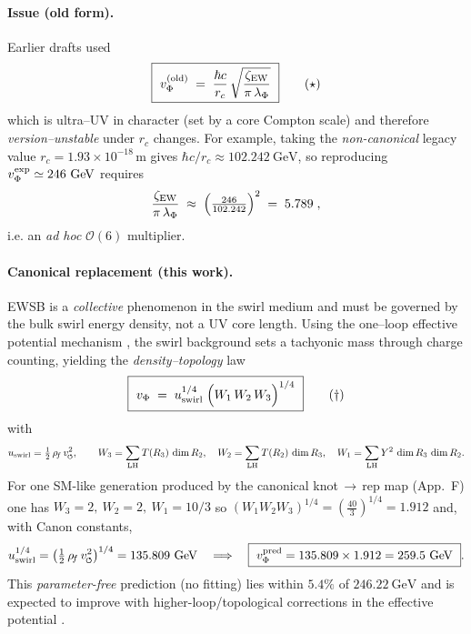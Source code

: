 \documentclass[11pt]{article}
\newcommand{\swirlarrow}{%
     \mathchoice{\mkern-2mu\scriptstyle\boldsymbol{\circlearrowleft}}%
                {\mkern-2mu\scriptstyle\boldsymbol{\circlearrowleft}}%
                {\mkern-2mu\scriptscriptstyle\boldsymbol{\circlearrowleft}}%
                {\mkern-2mu\scriptscriptstyle\boldsymbol{\circlearrowleft}}%
}
\newcommand{\vscore}{v_{\swirlarrow}}                    %
\newcommand{\rhof}{\rho_{\!f}}                           %
\begin{document}
\paragraph{Issue (old form).}
    Earlier drafts used
    \[
        \boxed{\ v_\Phi^{(\text{old})}\;=\;\frac{\hbar c}{r_c}\,
        \sqrt{\frac{\zeta_{\rm EW}}{\pi\,\lambda_\Phi}}\ }\qquad(\star)
    \]
    which is ultra–UV in character (set by a core Compton scale) and therefore \emph{version–unstable} under $r_c$ changes.
    For example, taking the \emph{non-canonical} legacy value $r_c=1.93\times 10^{-18}\,\mathrm{m}$ gives
    \(
    \hbar c/r_c \approx 102.242~\mathrm{GeV}
    \),
    so reproducing $v_\Phi^{\rm exp}\simeq 246~\mathrm{GeV}$ requires
    \[
        \frac{\zeta_{\rm EW}}{\pi\,\lambda_\Phi}\;\approx\;\Big(\tfrac{246}{102.242}\Big)^2\;=\;5.789\;,
    \]
    i.e. an \emph{ad hoc} $\mathcal O(6)$ multiplier.

\paragraph{Canonical replacement (this work).}
    EWSB is a \emph{collective} phenomenon in the swirl medium and must be governed by the bulk swirl energy density,
    not a UV core length. Using the one–loop effective potential mechanism \cite{ColemanWeinberg1973}, the swirl background
    sets a tachyonic mass through charge counting, yielding the \emph{density–topology} law
    \[
        \boxed{\ v_\Phi\;=\;u_{\rm swirl}^{1/4}\;\Big(W_1\,W_2\,W_3\Big)^{1/4}\ }\qquad(\dagger)
    \]
    with
    \[
        u_{\rm swirl}=\tfrac{1}{2}\,\rhof\,\vscore^2,\qquad
        W_3=\sum_{\rm LH} T(R_3)\,\dim R_2,\quad
        W_2=\sum_{\rm LH} T(R_2)\,\dim R_3,\quad
        W_1=\sum_{\rm LH} Y^2\,\dim R_3\,\dim R_2.
    \]
    For one SM-like generation produced by the canonical knot\,$\to$\,rep map (App.~F) one has
    \(
    W_3=2,\ W_2=2,\ W_1=10/3
    \)
    so
    \(
    (W_1W_2W_3)^{1/4}=(\tfrac{40}{3})^{1/4}=1.912
    \)
    and, with Canon constants,
    \[
        u_{\rm swirl}^{1/4}=\big(\tfrac12\,\rhof\,\vscore^2\big)^{1/4}=135.809~\mathrm{GeV}
        \quad\Longrightarrow\quad
        \boxed{\ v_\Phi^{\rm pred}=135.809\times 1.912=259.5~\mathrm{GeV}\ }.
    \]
    This \emph{parameter-free} prediction (no fitting) lies within $5.4\%$ of $246.22~\mathrm{GeV}$ and is expected
    to improve with higher-loop/topological corrections in the effective potential \cite{ColemanWeinberg1973}.
\end{document}
